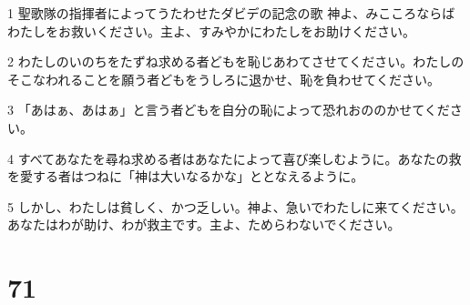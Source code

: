 \par 1 聖歌隊の指揮者によってうたわせたダビデの記念の歌 神よ、みこころならばわたしをお救いください。主よ、すみやかにわたしをお助けください。
\par 2 わたしのいのちをたずね求める者どもを恥じあわてさせてください。わたしのそこなわれることを願う者どもをうしろに退かせ、恥を負わせてください。
\par 3 「あはぁ、あはぁ」と言う者どもを自分の恥によって恐れおののかせてください。
\par 4 すべてあなたを尋ね求める者はあなたによって喜び楽しむように。あなたの救を愛する者はつねに「神は大いなるかな」ととなえるように。
\par 5 しかし、わたしは貧しく、かつ乏しい。神よ、急いでわたしに来てください。あなたはわが助け、わが救主です。主よ、ためらわないでください。

\chapter{71}

